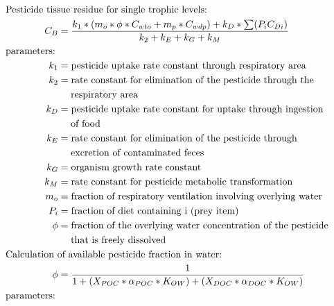 \documentclass[10pt]{article}
\begin{document}
\begin{align*}
& \hspace{-0.75in}  \text{Pesticide tissue residue for single trophic levels:} \nonumber \\
C_{B} & = \frac{k_{1} * (m_{o}*\phi*C_{wto} +m_{p}*C_{wdp})+k_{D}*\sum(P_{i}C_{Di})}{k_{2}+k_{E}+k_{G}+k_{M}} \nonumber \\
&    \hspace{-.75in}  \text{parameters:} \nonumber \\
k_{1} & = \text{pesticide uptake rate constant through respiratory area} \nonumber \\
k_{2} & = \text{rate constant for elimination of the pesticide through the}\nonumber \\ &\hspace{1.3em} \text{respiratory area} \nonumber \\
k_{D} & = \text{pesticide uptake rate constant for uptake through ingestion}\nonumber \\ &\hspace{1.3em} \text{of food} \nonumber\\
k_{E} & = \text{rate constant for elimination of the pesticide through}\nonumber \\ &\hspace{1.3em} \text{excretion of contaminated feces} \nonumber \\
k_{G} & = \text{organism growth rate constant} \nonumber \\
k_{M} & = \text{rate constant for pesticide metabolic transformation} \nonumber \\
m_{o} & = \text{fraction of respiratory ventilation involving overlying water} \nonumber \\
P_{i} & = \text{fraction of diet containing i (prey item)} \nonumber \\
\phi & = \text{fraction of the overlying water concentration of the pesticide}\nonumber \\ &\hspace{1.3em} \text{that is freely dissolved} \nonumber \\
&    \hspace{-.75in}  \text{Calculation of available pesticide fraction in water:} \nonumber \\ 
\phi & = \frac{1}{1+(X_{POC}*\alpha_{POC}*K_{OW})+(X_{DOC}*\alpha_{DOC}*K_{OW})} \nonumber \\
&    \hspace{-.75in}  \text{parameters:} \nonumber \\

\end{align*}
\end{document}
